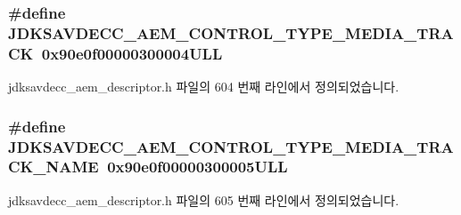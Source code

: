 \subsubsection[{\texorpdfstring{J\+D\+K\+S\+A\+V\+D\+E\+C\+C\+\_\+\+A\+E\+M\+\_\+\+C\+O\+N\+T\+R\+O\+L\+\_\+\+T\+Y\+P\+E\+\_\+\+M\+E\+D\+I\+A\+\_\+\+T\+R\+A\+CK}{JDKSAVDECC_AEM_CONTROL_TYPE_MEDIA_TRACK}}]{\setlength{\rightskip}{0pt plus 5cm}\#define J\+D\+K\+S\+A\+V\+D\+E\+C\+C\+\_\+\+A\+E\+M\+\_\+\+C\+O\+N\+T\+R\+O\+L\+\_\+\+T\+Y\+P\+E\+\_\+\+M\+E\+D\+I\+A\+\_\+\+T\+R\+A\+CK~0x90e0f00000300004\+U\+LL}\hypertarget{group__control__type_ga57fcc831f74468e3c14dbf647fd65e45}{}\label{group__control__type_ga57fcc831f74468e3c14dbf647fd65e45}


jdksavdecc\+\_\+aem\+\_\+descriptor.\+h 파일의 604 번째 라인에서 정의되었습니다.

\subsubsection[{\texorpdfstring{J\+D\+K\+S\+A\+V\+D\+E\+C\+C\+\_\+\+A\+E\+M\+\_\+\+C\+O\+N\+T\+R\+O\+L\+\_\+\+T\+Y\+P\+E\+\_\+\+M\+E\+D\+I\+A\+\_\+\+T\+R\+A\+C\+K\+\_\+\+N\+A\+ME}{JDKSAVDECC_AEM_CONTROL_TYPE_MEDIA_TRACK_NAME}}]{\setlength{\rightskip}{0pt plus 5cm}\#define J\+D\+K\+S\+A\+V\+D\+E\+C\+C\+\_\+\+A\+E\+M\+\_\+\+C\+O\+N\+T\+R\+O\+L\+\_\+\+T\+Y\+P\+E\+\_\+\+M\+E\+D\+I\+A\+\_\+\+T\+R\+A\+C\+K\+\_\+\+N\+A\+ME~0x90e0f00000300005\+U\+LL}\hypertarget{group__control__type_ga614eeb3cf04329a79d8fd01efb555f7b}{}\label{group__control__type_ga614eeb3cf04329a79d8fd01efb555f7b}


jdksavdecc\+\_\+aem\+\_\+descriptor.\+h 파일의 605 번째 라인에서 정의되었습니다.

